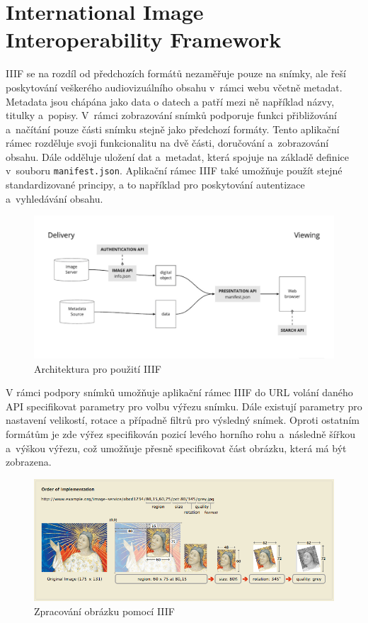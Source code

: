 \section{International Image Interoperability Framework}
IIIF \cite{IIIFIntroduction} se na rozdíl od předchozích formátů nezaměřuje pouze na snímky, ale řeší poskytování veškerého audiovizuálního obsahu v~rámci webu včetně metadat. Metadata jsou chápána jako data o datech a patří mezi ně například názvy, titulky a~popisy. V~rámci zobrazování snímků podporuje funkci přibližování a~načítání pouze části snímku stejně jako předchozí formáty. Tento aplikační rámec rozděluje svoji funkcionalitu na dvě části, doručování a~zobrazování obsahu. Dále odděluje uložení dat a~metadat, která spojuje na základě definice v~souboru \texttt{manifest.json}. Aplikační rámec IIIF také umožňuje použít stejné standardizované principy, a to například pro poskytování autentizace a~vyhledávání obsahu. 
\newpage
\begin{figure}[htbp]
\centering
    \includegraphics[scale=.15]{obrazky-figures/formats/IIIF_Architecture.png}
    \caption{Architektura pro použití IIIF\protect\footnotemark}
\end{figure}

\noindent
V rámci podpory snímků umožňuje aplikační rámec IIIF do URL volání daného API specifikovat parametry pro volbu výřezu snímku. Dále existují parametry pro nastavení velikostí, rotace a případně filtrů pro výsledný snímek. Oproti ostatním formátům je zde výřez specifikován pozicí levého horního rohu a~následně šířkou a~výškou výřezu, což umožňuje přesně specifikovat část obrázku, která má být zobrazena.

\begin{figure}[htbp]
\centering
    \includegraphics[scale=.45]{obrazky-figures/formats/IIIF_image_processing.png}
    \caption{Zpracování obrázku pomocí IIIF\protect\footnotemark[2]}
\end{figure}

